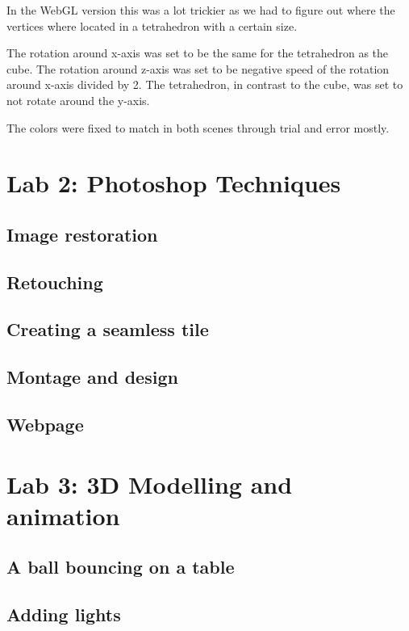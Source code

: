 \documentclass[a4paper]{article}
\begin{document}
In the WebGL version this was a lot trickier as we had to figure out where the
vertices where located in a tetrahedron with a certain size.

The rotation around x-axis was set to be the same for the tetrahedron as the
cube. The rotation around z-axis was set to be negative speed of the rotation
around x-axis divided by 2. The tetrahedron, in contrast to the cube, was set to
not rotate around the y-axis.

The colors were fixed to match in both scenes through trial and error mostly.

\section{Lab 2: Photoshop Techniques}

\subsection{Image restoration} %

\subsection{Retouching} %

\subsection{Creating a seamless tile} %

\subsection{Montage and design} %

\subsection{Webpage} %

\section{Lab 3: 3D Modelling and animation}

\subsection{A ball bouncing on a table} %

\subsection{Adding lights} %
\end{document}
